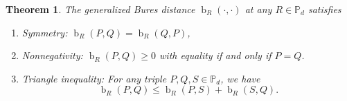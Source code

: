 \documentclass[12pt]{article}
\newtheorem{theorem}{Theorem}[section] %
\theoremstyle{definition}
\begin{document}
\begin{theorembox}
\begin{theorem}
    The generalized Bures distance $\operatorname{b}_R( \cdot, \cdot)$ at any $R \in \mathbb P_d$ satisfies
    \begin{enumerate}
        \item Symmetry: $\operatorname{b}_R(P,Q) = \operatorname{b}_R(Q,P)$, 
        \item Nonnegativity: $\operatorname{b}_R(P,Q) \geq 0$ with equality if and only if $P = Q$. 
        \item Triangle inequality: For any triple $P,Q,S \in \mathbb P_d$, we have
        \begin{equation}
            \operatorname{b}_R(P,Q) \leq \operatorname{b}_R(P,S) + \operatorname{b}_R(S,Q).
        \end{equation}
    \end{enumerate}
\end{theorem}
\end{theorembox}
\end{document}
